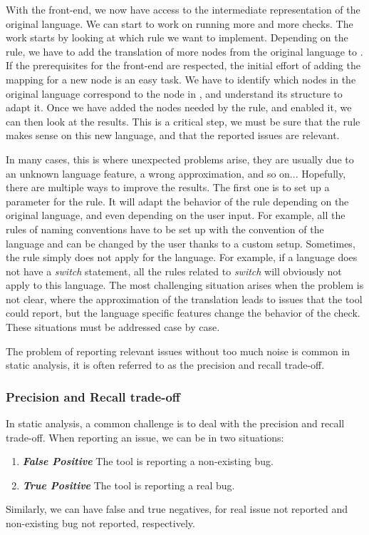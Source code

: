With the front-end, we now have access to the intermediate representation of the original language. 
We can start to work on running more and more checks. 
The work starts by looking at which rule we want to implement. 
Depending on the rule, we have to add the translation of more nodes from the original language to \slang{}. 
If the prerequisites for the front-end are respected, the initial effort of adding the mapping for a new node is an easy task.
We have to identify which nodes in the original language correspond to the node in \slang{}, and understand its structure to adapt it. 
Once we have added the nodes needed by the rule, and enabled it, we can then look at the results. 
This is a critical step, we must be sure that the rule makes sense on this new language, and that the reported issues are relevant. 

In many cases, this is where unexpected problems arise, they are usually due to an unknown language feature, a wrong approximation, and so on...
Hopefully, there are multiple ways to improve the results. 
The first one is to set up a parameter for the rule.
It will adapt the behavior of the rule depending on the original language, and even depending on the user input.
For example, all the rules of naming conventions have to be set up with the convention of the language and can be changed by the user thanks to a custom setup. 
Sometimes, the rule simply does not apply for the language. 
For example, if a language does not have a \emph{switch} statement, all the rules related to \emph{switch} will obviously not apply to this language.
The most challenging situation arises when the problem is not clear, where the approximation of the translation leads to issues that the tool could report, but the language specific features change the behavior of the check. 
These situations must be addressed case by case.

The problem of reporting relevant issues without too much noise is common in static analysis, it is often referred to as the precision and recall trade-off.

\subsubsection{Precision and Recall trade-off}
\label{subsubsec:precision_recall}

In static analysis, a common challenge is to deal with the precision and recall trade-off. When reporting an issue, we can be in two situations:

\begin{enumerate}
	\item \textbf{\textit{False Positive}} \newline The tool is reporting a non-existing bug.
	\item \textbf{\textit{True Positive}} \newline The tool is reporting a real bug. 
\end{enumerate}
Similarly, we can have false and true negatives, for real issue not reported and non-existing bug not reported, respectively. 

